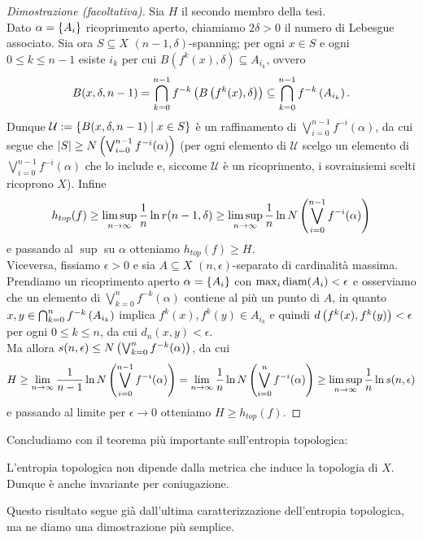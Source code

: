 \begin{proof}[Dimostrazione (facoltativa)]Sia $H$ il secondo membro della tesi. \\
Dato $\alpha=\left\{A_i\right\}$ ricoprimento aperto, chiamiamo $2\delta>0$ il numero di Lebesgue
associato. Sia ora $S\subseteq X$ $(n-1,\delta)$-spanning; per ogni $x\in S$ e ogni $0\le k\le n-1$ esiste $i_k$ per cui
$B(f^k(x),\delta)\subseteq A_{i_k}$, ovvero
\[ B(x,\delta,n-1)=\bigcap_{k=0}^{n-1} f^{-k}\left(B\left(f^k(x),\delta\right)\right)\subseteq\bigcap_{k=0}^{n-1} f^{-k}\left(A_{i_k}\right). \]
Dunque $\mathcal{U}:=\left\{B(x,\delta,n-1)\mid x\in S\right\}$ è un raffinamento di $\bigvee_{i=0}^{n-1}f^{-i}(\alpha)$,
da cui segue che $\left|S\right|\ge N\left(\bigvee_{i=0}^{n-1}f^{-i}(\alpha)\right)$ (per ogni elemento di $\mathcal{U}$
scelgo un elemento di $\bigvee_{i=0}^{n-1}f^{-i}(\alpha)$ che lo include e, siccome $\mathcal{U}$ è un ricoprimento,
i sovrainsiemi scelti ricoprono $X$). Infine
\[ h_{top}(f)\ge\limsup_{n\to\infty}\frac{1}{n}\ln r(n-1,\delta)
\ge\limsup_{n\to\infty}\frac{1}{n}\ln N\left(\bigvee_{i=0}^{n-1}f^{-i}(\alpha)\right) \]
e passando al $\sup$ su $\alpha$ otteniamo $h_{top}(f)\ge H$. \\
Viceversa, fissiamo $\epsilon>0$ e sia $A\subseteq X$ $(n,\epsilon)$-separato di cardinalità massima.
Prendiamo un ricoprimento aperto $\alpha=\left\{A_i\right\}$ con $\max_i\operatorname{diam}(A_i)<\epsilon$ e osserviamo
che un elemento di $\bigvee_{k=0}^n f^{-k}(\alpha)$ contiene al più un punto di $A$,
in quanto $x,y\in\bigcap_{k=0}^n f^{-k}\left(A_{i_k}\right)$ implica $f^k(x),f^k(y)\in A_{i_k}$ e quindi $d\left(f^k(x),f^k(y)\right)<\epsilon$
per ogni $0\le k\le n$, da cui $d_n(x,y)<\epsilon$. \\
Ma allora $s(n,\epsilon)\le N\left(\bigvee_{k=0}^n f^{-k}(\alpha)\right)$, da cui
\[ H\ge\lim_{n\to\infty}\frac{1}{n-1}\ln N\left(\bigvee_{i=0}^{n-1}f^{-i}(\alpha)\right)
=\lim_{n\to\infty}\frac{1}{n}\ln N\left(\bigvee_{i=0}^n f^{-i}(\alpha)\right)\ge\limsup_{n\to\infty}\frac{1}{n}\ln s(n,\epsilon) \]
e passando al limite per $\epsilon\to 0$ otteniamo $H\ge h_{top}(f)$.
\end{proof}

Concludiamo con il teorema più importante sull'entropia topologica:

\begin{teo}L'entropia topologica non dipende dalla metrica che induce la topologia di $X$.
Dunque è anche invariante per coniugazione.
\end{teo}

Questo risultato segue già dall'ultima caratterizzazione dell'entropia topologica, ma ne diamo una dimostrazione più semplice.

